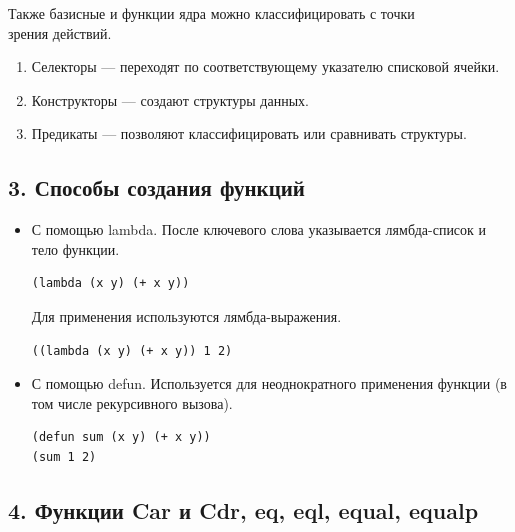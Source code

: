 Также базисные и функции ядра можно классифицировать с точки \\зрения действий.
\begin{enumerate}
	\item Селекторы --- переходят по соответствующему указателю списковой ячейки.
	\item Конструкторы --- создают структуры данных.
	\item Предикаты --- позволяют классифицировать или сравнивать структуры.
\end{enumerate}

\subsection*{3. Способы создания функций}

\begin{itemize}
	\item С помощью lambda. После ключевого слова указывается лямбда-список и тело функции. 
	\begin{lstlisting}
(lambda (x y) (+ x y))
	\end{lstlisting}
	Для применения используются лямбда-выражения.
	\begin{lstlisting}
((lambda (x y) (+ x y)) 1 2)
	\end{lstlisting}
	\item С помощью defun. Используется для неоднократного применения функции (в том числе рекурсивного вызова).
	\begin{lstlisting}
(defun sum (x y) (+ x y))
(sum 1 2)
	\end{lstlisting}

\end{itemize}

\subsection*{4. Функции Car и Cdr, eq, eql, equal, equalp}

